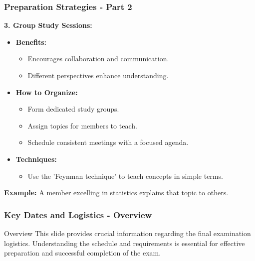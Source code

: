 \documentclass[aspectratio=169]{beamer}
\begin{document}
\begin{frame}[fragile]
    \frametitle{Preparation Strategies - Part 2}
    \textbf{3. Group Study Sessions:}
    \begin{itemize}
        \item \textbf{Benefits:}
        \begin{itemize}
            \item Encourages collaboration and communication.
            \item Different perspectives enhance understanding.
        \end{itemize}
        \item \textbf{How to Organize:}
        \begin{itemize}
            \item Form dedicated study groups.
            \item Assign topics for members to teach.
            \item Schedule consistent meetings with a focused agenda.
        \end{itemize}
        \item \textbf{Techniques:}
        \begin{itemize}
            \item Use the 'Feynman technique' to teach concepts in simple terms.
        \end{itemize}
    \end{itemize}

    \textbf{Example:} A member excelling in statistics explains that topic to others.
\end{frame}

\begin{frame}[fragile]
    \frametitle{Key Dates and Logistics - Overview}
    \begin{block}{Overview}
        This slide provides crucial information regarding the final examination logistics. 
        Understanding the schedule and requirements is essential for effective preparation and 
        successful completion of the exam.
    \end{block}
\end{frame}
\end{document}
